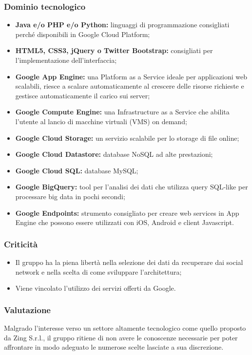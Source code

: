 \subsubsection{Dominio tecnologico}
\begin{itemize}
\item \textbf{Java e/o PHP e/o Python:} linguaggi di programmazione consigliati perché disponibili in Google Cloud Platform;
\item \textbf{HTML5, CSS3, jQuery o Twitter Bootstrap:} consigliati per l'implementazione dell'interfaccia;
\item \textbf{Google App Engine:} una Platform as a Service ideale per applicazioni web scalabili, riesce a scalare automaticamente al crescere 
 delle risorse richieste e gestisce automaticamente il carico sui server;
\item \textbf{Google Compute Engine:} una Infrastructure as a Service che abilita l'utente al lancio di macchine virtuali (VMS) on demand;
\item \textbf{Google Cloud Storage:} un servizio scalabile per lo storage di file online;
\item \textbf{Google Cloud Datastore:} database NoSQL ad alte prestazioni;
\item \textbf{Google Cloud SQL:} database MySQL;
\item \textbf{Google BigQuery:} tool per l'analisi dei dati che utilizza query SQL-like per processare big data in pochi secondi;
\item \textbf{Google Endpoints:} strumento consigliato per creare web services in App Engine che possono essere utilizzati con iOS, Android e client Javascript.
\end{itemize}

\subsubsection{Criticità}
\begin{itemize}
\item Il gruppo ha la piena libertà nella selezione dei dati da recuperare dai social network e nella scelta di come sviluppare l'architettura;
\item Viene vincolato l'utilizzo dei servizi offerti da Google.
\end{itemize}

\subsubsection{Valutazione}
Malgrado l'interesse verso un settore altamente tecnologico come quello proposto da Zing S.r.l., il gruppo \gruppo ritiene di non avere le 
conoscenze necessarie per poter affrontare in modo adeguato le numerose scelte lasciate a sua discrezione.

